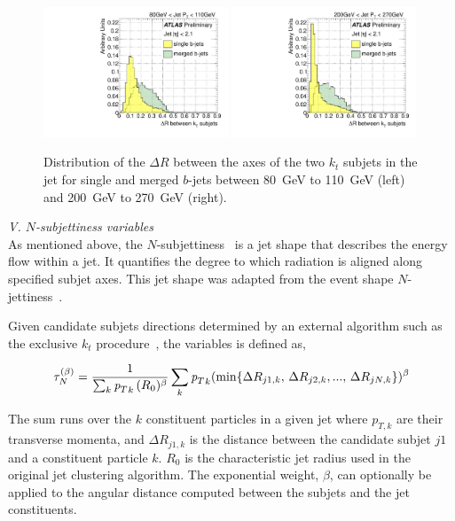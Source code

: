 \begin{figure}[tp]
\centering
\includegraphics[width=0.49\textwidth]{FIGS/VarsSingleMerged/DRkt2axes080.pdf}
\includegraphics[width=0.49\textwidth]{FIGS/VarsSingleMerged/DRkt2axes200.pdf}
\caption{Distribution of the $\Delta R$ between the axes of the two $k_t$ subjets in the jet for single and merged $b$-jets between 80~GeV to 110~GeV (left) and 200~GeV to 270~GeV (right).}
\label{fig:drktsinglemerged}
\end{figure}


{ \em V. $N$-subjettiness variables}
\\[3mm]


As mentioned above, the $N$-subjettiness~\cite{nsubjettiness} is a jet shape that describes the energy flow within a jet. It quantifies the degree to which  radiation is aligned along specified subjet axes. This jet shape was adapted from the event shape $N$-jettiness~\cite{njetti}.

Given candidate subjets directions determined by an external algorithm such as the exclusive $k_t$ procedure~\cite{exclusivekt}, the variables is defined as,


\begin{equation} 
\tau^{(\beta)}_N = \frac{1}{\sum_k {{\emph{p}_{T}}}_k\,(R_0)^{\beta}} \sum_k {{\emph{p}_{T}}}_k (\min \{ \Delta R_{j1,k},\,\Delta R_{j2,k},...,\,\Delta R_{jN,k} \})^{\beta}
\label{eqn:nsubjet}
\end{equation} 

The sum runs over the $k$ constituent particles in a given jet where $p_{T,k}$ are their transverse momenta, and $\Delta R_{j1,k}$ is the distance between the candidate subjet $j1$ and a constituent particle $k$.  $R_0$ is the characteristic jet radius used in the original jet clustering algorithm.
The exponential weight, $\beta$, can optionally be applied to the angular distance computed between the subjets and the jet constituents.  

